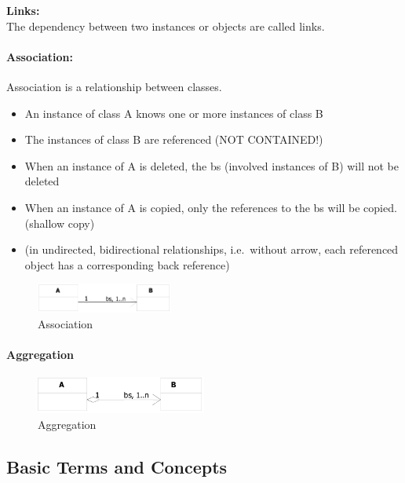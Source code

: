 \textbf{Links:}\\
The dependency between two instances or objects are called links.

\hypertarget{association}{%
\paragraph{Association:}\label{association}}

Association is a relationship between classes. 

\begin{itemize}
    \item An instance of class A knows one or more instances of class B
    \item The instances of class B are referenced (NOT CONTAINED!)
    \item When an instance of A is deleted, the bs (involved instances of B) will not be deleted
    \item When an instance of A is copied, only the references to the bs will be copied. (shallow copy)
    \item (in undirected, bidirectional relationships, i.e.~without arrow, each referenced object has a corresponding back reference)
\end{itemize}

\begin{figure}[H]
\centering
\includegraphics[width=0.4\textwidth]{figures/associationUml.png}
\caption{Association}
\end{figure}

\hypertarget{aggregation}{%
\paragraph{Aggregation}\label{aggregation}}

\begin{figure}[H]
\centering
\includegraphics[width=0.5\textwidth]{figures/aggregtionUml.png}
\caption{Aggregation}
\end{figure}

\hypertarget{basic-terms-and-concepts}{%
\subsection{Basic Terms and Concepts}\label{basic-terms-and-concepts}}

